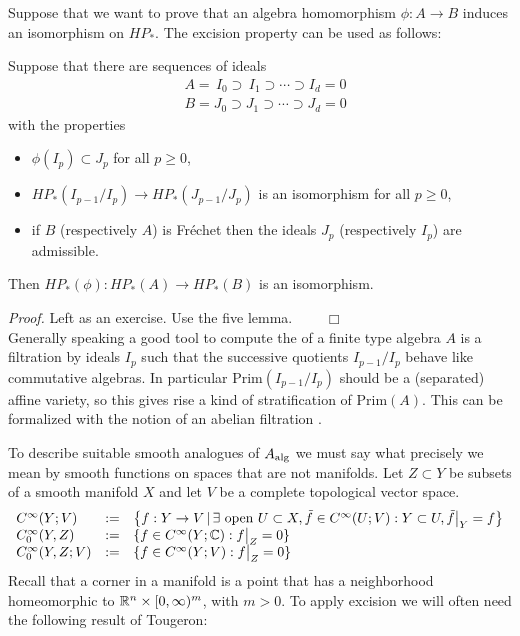 Suppose that we want to prove that an algebra homomorphism
$\phi : A \to B$ induces an isomorphism on $HP_*$. The excision
property can be used as follows:

\begin{lem}\label{lem:1.3}
Suppose that there are sequences of ideals
\begin{align*}
& A = \, I_0 \supset \, I_1 \supset \cdots \supset I_d = 0 \\
& B = J_0 \supset J_1 \supset \cdots \supset J_d = 0
\end{align*}
with the properties
\begin{itemize}
\item $\phi (I_p ) \subset J_p$ for all $p \geq 0$,
\item $HP_* (I_{p-1} / I_p ) \to HP_* (J_{p-1} / J_p)$ is an
isomorphism for all $p \geq 0$,
\item if $B$ \textup{(}respectively $A$\textup{)} is Fr\'echet then the ideals
$J_p$ \textup{(}respectively $I_p$\textup{)} are admissible.
\end{itemize}
Then $HP_* (\phi) : HP_* (A) \to HP_* (B)$ is an isomorphism.
\end{lem}
\emph{Proof.}
Left as an exercise. Use the five lemma. $\qquad \Box$
\\[2mm]

Generally speaking a good tool to compute the \pch of a
finite type algebra $A$ is a filtration by ideals $I_p$ such that
the successive quotients $I_{p-1} / I_p$ behave like
commutative algebras. In particular Prim$ (I_{p-1}/I_p )$
should be a (separated) affine variety, so this gives rise a
kind of stratification of Prim$ (A)$. This can be formalized with the notion of 
an abelian filtration \cite{KNS}.

To describe suitable smooth analogues of $A_\mathrm{alg}$ we must say what
precisely we mean by smooth functions on spaces that are not
manifolds. Let $Z \subset Y$ be subsets of a smooth manifold $X$ and let
$V$ be a complete topological vector space.
\[
\begin{array}{lll}
C^\infty (Y ; V) & := & \big\{ f : Y \to V \,|\, \exists \text{
open } U \subset X , \tilde f \in C^\infty (U ; V) :
Y \subset U , \tilde f \big|_Y = f \big\} \\
C^\infty_0 (Y,Z) & := &
\{ f \in C^\infty (Y ; \mathbb C) : f \big|_Z = 0 \} \\
C^\infty_0 (Y,Z;V) & := & \{ f \in C^\infty (Y ; V) : f \big|_Z = 0 \}
\end{array}
\]
Recall that a corner in a manifold is a point that has a neighborhood 
homeomorphic to $\mathbb R^n \times [0,\infty )^m$, with $m > 0$. To 
apply excision we will often need the following result of Tougeron:

